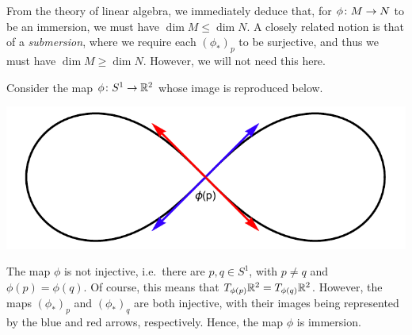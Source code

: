 
From the theory of linear algebra, we immediately deduce that, for $\phi\colon M\to N$ to be an immersion, we must have $\dim M \leq \dim N$. A closely related notion is that of a \emph{submersion}, where we require each $(\phi_*)_p$ to be surjective, and thus we must have $\dim M \geq \dim N$. However, we will not need this here. 

\be
Consider the map $\phi\colon S^1\to \mathbb{R}^2$ whose image is reproduced below.

\begin{center}
\includegraphics[scale=0.8]{graphics/immers}
\end{center}
\ee
The map $\phi$ is not injective, i.e.\ there are $p,q\in S^1$, with $p\neq q$ and $\phi(p)=\phi(q)$. Of course, this means that $T_{\phi(p)}\mathbb{R}^2=T_{\phi(q)}\mathbb{R}^2$. However, the maps $(\phi_*)_p$ and $(\phi_*)_q$ are both injective, with their images being represented by the blue and red arrows, respectively. Hence, the map $\phi$ is immersion.

